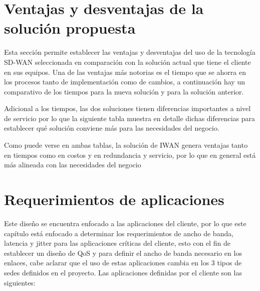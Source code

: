 \section{Ventajas y desventajas de la solución propuesta} %
\label{sec:Ventajas y desventajas de la solución propuesta}

Esta sección permite establecer las ventajas y desventajas del uso de la tecnología SD-WAN seleccionada en comparación con la solución actual que tiene el cliente en sus equipos.
Una de las ventajas más notorias es el tiempo que se ahorra en los procesos tanto de implementación como de cambios, a continuación hay un comparativo de los tiempos para la nueva solución y para la solución anterior.

Adicional a los tiempos, las dos soluciones tienen diferencias importantes a nivel de servicio por lo que la siguiente tabla muestra en detalle dichas diferencias para establecer qué solución conviene más para las necesidades del negocio.

Como puede verse en ambas tablas, la solución de IWAN genera ventajas tanto en tiempos como en costos y en redundancia y servicio, por lo que en general está más alineada con las necesidades del negocio


\section{Requerimientos de aplicaciones} %
\label{sec:Requerimientos de aplicaciones}

Este diseño se encuentra enfocado a las aplicaciones del cliente, por lo que este capítulo está enfocado a determinar los requerimientos de ancho de banda, latencia y jitter para las aplicaciones críticas del cliente, esto con el fin de establecer un diseño de QoS y para definir el ancho de banda necesario en los enlaces, cabe aclarar que el uso de estas aplicaciones cambia en los 3 tipos de sedes definidos en el proyecto. Las aplicaciones definidas por el cliente son las siguientes:

